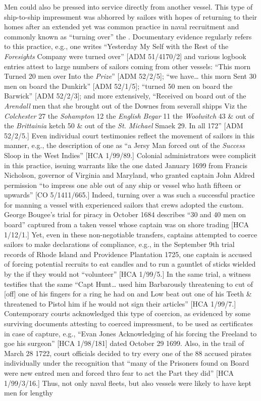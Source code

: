Men could also be pressed into service directly from another vessel. This type of ship-to-ship impressment was abhorred by  sailors with hopes of returning to their homes after an extended  yet was common practice in naval recruitment and commonly known as “turning over” the . Documentary evidence regularly refers to this practice, e.g., one  writes “Yesterday My Self with the Rest of the \textit{Foresights} Company were turned over” [ADM 51/4170/2] and various logbook entries attest to large numbers of sailors coming from other vessels: “This morn Turned 20 men over Into the \textit{ Prize}” [ADM 52/2/5]; “we have… this morn Sent 30 men on board the Dunkirk” [ADM 52/1/5]; “turned 50 men on board the Barwick” [ADM 52/2/3]; and more extensively, “Received on board out of the \textit{Arendall} men that she brought out of the Downes from severall shipps Viz the \textit{Colchester} 27 the \textit{Sohampton} 12 the \textit{English Begar} 11 the \textit{Woolwitch} 43 \& out of the \textit{Brittainia} ketch 50 \& out of the \textit{St. Michael} Smaek 29. In all 172” [ADM 52/2/5.] Even individual court testimonies reflect the movement of sailors in this manner, e.g., the description of one  as “a Jersy Man forced out of the \textit{Success} Sloop in the West Indies” [HCA 1/99/89.] Colonial administrators were complicit in this practice, issuing warrants like the one dated January {1699} from Francis Nicholson, governor of Virginia and Maryland, who granted captain John Aldred permission “to impress one able  out of any ship or vessel who hath fifteen  or upwards” [CO 5/1411/665.] Indeed, turning over a  was such a successful practice for manning a vessel with experienced sailors that  crews adopted the custom. George Bougee’s trial for piracy in October {1684} describes “30 and 40 men on board” captured from a taken vessel whose captain was on shore trading [HCA 1/12/1.] Yet, even in these non-negotiable transfers, captains attempted to coerce sailors to make declarations of compliance, e.g., in the September 9th trial records of Rhode Island and Providence Plantation 1725, one  captain is accused of forcing potential recruits to eat candles and to run a gauntlet of sticks wielded by the  if they would not “volunteer” [HCA 1/99/5.] In the same trial, a witness testifies that the same “Capt Hunt… used him Barbarously threatening to cut of [off] one of his fingers for a ring he had on and Low beat out one of his Teeth \& threatened to Pistol him if he would not sign their articles” [HCA 1/99/7.] Contemporary courts acknowledged this type of coercion, as evidenced by some surviving documents attesting to coerced impressment, to be used as certificates in case of capture, e.g., “Evan Jones Acknowledging of his forcing the Freeland to goe his surgeon” [HCA 1/98/181] dated October 29 1699. Also, in the trail of March 28 1722, court officials decided to try every one of the 88 accused pirates individually under the recognition that “many of the Prisoners found on Board were new entred men and forced thro fear to act the Part they did” [HCA 1/99/3/16.] Thus, not only naval fleets, but also  vessels were likely to have kept men for lengthy 